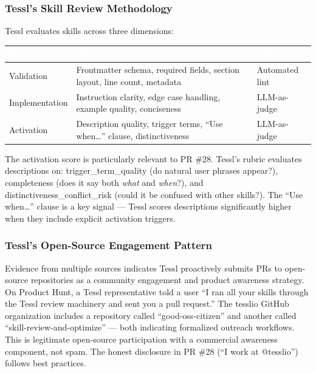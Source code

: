 \documentclass[11pt,letterpaper]{article}
\newcommand{\tableheader}[1]{\textbf{\sffamily\textcolor{white}{#1}}}
\begin{document}
\subsubsection{Tessl's Skill Review Methodology}

Tessl evaluates skills across three dimensions:

\begin{center}
\begin{tabularx}{\textwidth}{L{3cm}XL{2.5cm}}
\toprule
{}
\tableheader{Dimension} & \tableheader{What It Measures} & \tableheader{Method} \\
\midrule
Validation & Frontmatter schema, required fields, section layout, line count, metadata & Automated lint \\
Implementation & Instruction clarity, edge case handling, example quality, conciseness & LLM-as-judge \\
Activation & Description quality, trigger terms, ``Use when\ldots'' clause, distinctiveness & LLM-as-judge \\
\bottomrule
\end{tabularx}
\end{center}

The activation score is particularly relevant to PR \#28. Tessl's rubric evaluates descriptions on: trigger\_term\_quality (do natural user phrases appear?), completeness (does it say both \emph{what} and \emph{when}?), and distinctiveness\_conflict\_risk (could it be confused with other skills?). The ``Use when\ldots'' clause is a key signal --- Tessl scores descriptions significantly higher when they include explicit activation triggers.

\subsubsection{Tessl's Open-Source Engagement Pattern}

Evidence from multiple sources indicates Tessl proactively submits PRs to open-source repositories as a community engagement and product awareness strategy. On Product Hunt, a Tessl representative told a user ``I ran all your skills through the Tessl review machinery and sent you a pull request.'' The tesslio GitHub organization includes a repository called ``good-oss-citizen'' and another called ``skill-review-and-optimize'' --- both indicating formalized outreach workflows. This is legitimate open-source participation with a commercial awareness component, not spam. The honest disclosure in PR \#28 (``I work at @tesslio'') follows best practices.
\end{document}
